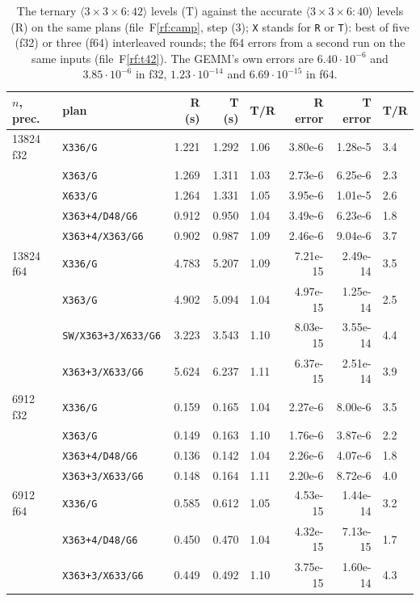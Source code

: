 \documentclass[11pt]{article}
\newcommand{\rf}[1]{F\ref{rf:#1}}
\newcommand{\mm}[1]{\langle #1\rangle}
\newcommand{\lv}[1]{\texttt{#1}}
\begin{document}
\begin{table}[t]
\centering\footnotesize
\begin{tabular}{llrrlrrl}
\toprule
$n$, prec. & plan & R (s) & T (s) & T/R & R error & T error & T/R\\
\midrule
13824 f32 & \lv{X336/G} & 1.221 & 1.292 & 1.06 & 3.80e-6 & 1.28e-5 & 3.4\\
 & \lv{X363/G} & 1.269 & 1.311 & 1.03 & 2.73e-6 & 6.25e-6 & 2.3\\
 & \lv{X633/G} & 1.264 & 1.331 & 1.05 & 3.95e-6 & 1.01e-5 & 2.6\\
 & \lv{X363+4/D48/G6} & 0.912 & 0.950 & 1.04 & 3.49e-6 & 6.23e-6 & 1.8\\
 & \lv{X363+4/X363/G6} & 0.902 & 0.987 & 1.09 & 2.46e-6 & 9.04e-6 & 3.7\\
\midrule
13824 f64 & \lv{X336/G} & 4.783 & 5.207 & 1.09 & 7.21e-15 & 2.49e-14 & 3.5\\
 & \lv{X363/G} & 4.902 & 5.094 & 1.04 & 4.97e-15 & 1.25e-14 & 2.5\\
 & \lv{SW/X363+3/X633/G6} & 3.223 & 3.543 & 1.10 & 8.03e-15 & 3.55e-14 & 4.4\\
 & \lv{X363+3/X633/G6} & 5.624 & 6.237 & 1.11 & 6.37e-15 & 2.51e-14 & 3.9\\
\midrule
6912 f32 & \lv{X336/G} & 0.159 & 0.165 & 1.04 & 2.27e-6 & 8.00e-6 & 3.5\\
 & \lv{X363/G} & 0.149 & 0.163 & 1.10 & 1.76e-6 & 3.87e-6 & 2.2\\
 & \lv{X363+4/D48/G6} & 0.136 & 0.142 & 1.04 & 2.26e-6 & 4.07e-6 & 1.8\\
 & \lv{X363+3/X633/G6} & 0.148 & 0.164 & 1.11 & 2.20e-6 & 8.72e-6 & 4.0\\
\midrule
6912 f64 & \lv{X336/G} & 0.585 & 0.612 & 1.05 & 4.53e-15 & 1.44e-14 & 3.2\\
 & \lv{X363+4/D48/G6} & 0.450 & 0.470 & 1.04 & 4.32e-15 & 7.13e-15 & 1.7\\
 & \lv{X363+3/X633/G6} & 0.449 & 0.492 & 1.10 & 3.75e-15 & 1.60e-14 & 4.3\\
\bottomrule
\end{tabular}
\caption{The ternary $\mm{3\times3\times6:42}$ levels (T) against the accurate
$\mm{3\times3\times6:40}$ levels (R) on the same plans
(file~\rf{camp}, step (3); \lv{X} stands for \lv{R} or
\lv{T}): best of five (f32) or three (f64) interleaved rounds; the f64
errors from a second run on the same inputs
(file~\rf{t42}).  The GEMM's own errors are
$6.40\cdot10^{-6}$ and $3.85\cdot10^{-6}$ in f32, $1.23\cdot10^{-14}$ and
$6.69\cdot10^{-15}$ in f64.}
\label{tab:ternary}
\end{table}
\end{document}
